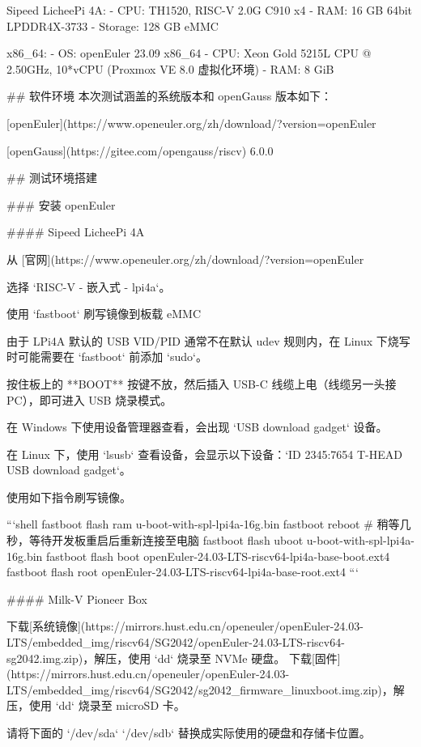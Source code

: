 \documentclass{article}
\begin{document}
\begin{markdown}
Sipeed LicheePi 4A:
- CPU: TH1520, RISC-V 2.0G C910 x4
- RAM: 16 GB 64bit LPDDR4X-3733
- Storage: 128 GB eMMC

x86_64:
- OS: openEuler 23.09 x86_64
- CPU: Xeon Gold 5215L CPU @ 2.50GHz, 10*vCPU (Proxmox VE 8.0 虚拟化环境)
- RAM: 8 GiB

## 软件环境
本次测试涵盖的系统版本和 openGauss 版本如下：

[openEuler](https://www.openeuler.org/zh/download/?version=openEuler%

[openGauss](https://gitee.com/opengauss/riscv) 6.0.0

## 测试环境搭建

### 安装 openEuler

#### Sipeed LicheePi 4A

从 [官网](https://www.openeuler.org/zh/download/?version=openEuler%

选择 `RISC-V - 嵌入式 - lpi4a`。

使用 `fastboot` 刷写镜像到板载 eMMC

由于 LPi4A 默认的 USB VID/PID 通常不在默认 udev 规则内，在 Linux 下烧写时可能需要在 `fastboot` 前添加 `sudo`。

按住板上的 **BOOT** 按键不放，然后插入 USB-C 线缆上电（线缆另一头接 PC），即可进入 USB 烧录模式。

在 Windows 下使用设备管理器查看，会出现 `USB download gadget` 设备。

在 Linux 下，使用 `lsusb` 查看设备，会显示以下设备：`ID 2345:7654 T-HEAD USB download gadget`。

使用如下指令刷写镜像。

```shell
fastboot flash ram u-boot-with-spl-lpi4a-16g.bin
fastboot reboot
# 稍等几秒，等待开发板重启后重新连接至电脑
fastboot flash uboot u-boot-with-spl-lpi4a-16g.bin
fastboot flash boot openEuler-24.03-LTS-riscv64-lpi4a-base-boot.ext4
fastboot flash root openEuler-24.03-LTS-riscv64-lpi4a-base-root.ext4
```

#### Milk-V Pioneer Box

下载[系统镜像](https://mirrors.hust.edu.cn/openeuler/openEuler-24.03-LTS/embedded_img/riscv64/SG2042/openEuler-24.03-LTS-riscv64-sg2042.img.zip)，解压，使用 `dd` 烧录至 NVMe 硬盘。
下载[固件](https://mirrors.hust.edu.cn/openeuler/openEuler-24.03-LTS/embedded_img/riscv64/SG2042/sg2042_firmware_linuxboot.img.zip)，解压，使用 `dd` 烧录至 microSD 卡。

请将下面的 `/dev/sda` `/dev/sdb` 替换成实际使用的硬盘和存储卡位置。


\end{markdown}
\end{document}

